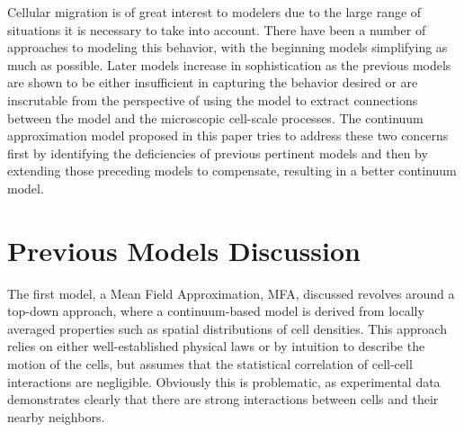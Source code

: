 \documentclass[12pt,letterpaper,cm]{article}
\renewcommand{\.}{\cdot}
\newcommand{\<}{\langle}
\renewcommand{\>}{\rangle}
\begin{document}
	Cellular migration is of great interest to modelers due to the large range of situations it is necessary to take into account.  There have been a number of approaches to modeling this behavior, with the beginning models simplifying as much as possible.  Later models increase in sophistication as the previous models are shown to be either insufficient in capturing the behavior desired or are inscrutable from the perspective of using the model to extract connections between the model and the microscopic cell-scale processes.  The continuum approximation model proposed in this paper tries to address these two concerns first by identifying the deficiencies of previous pertinent models and then by extending those preceding models to compensate, resulting in a better continuum model.   
	\section{Previous Models Discussion}
	\indent
	
	The first model, a Mean Field Approximation, MFA, discussed revolves around a top-down approach, where a continuum-based model is derived from locally averaged properties such as spatial distributions of cell densities.  This approach relies on either well-established physical laws or by intuition to describe the motion of the cells, but assumes that the statistical correlation of cell-cell interactions are negligible.  Obviously this is problematic, as experimental data demonstrates clearly that there are strong interactions between cells and their nearby neighbors.  
	
\end{document}
